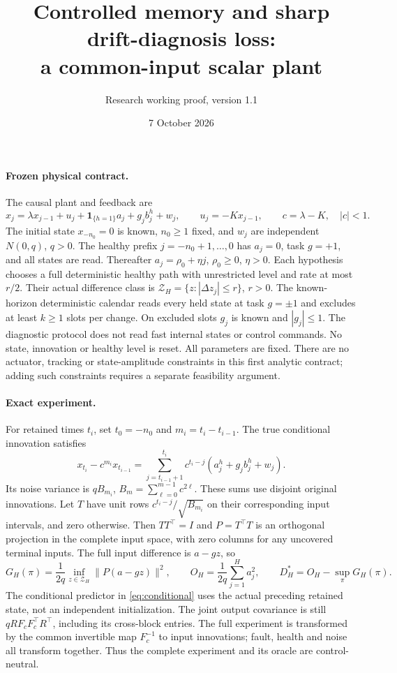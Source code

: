 \documentclass[11pt]{article}
\title{Controlled memory and sharp drift-diagnosis loss:\\a common-input scalar plant}
\author{Research working proof, version 1.1}
\date{7 October 2026}
\begin{document}
\maketitle
\paragraph{Frozen physical contract.}
The causal plant and feedback are
\[
x_j=\lambda x_{j-1}+u_j+\mathbf1_{\{h=1\}}a_j+g_jb_j^h+w_j,\qquad
u_j=-Kx_{j-1},\qquad c=\lambda-K,\quad |c|<1.
\]
The initial state $x_{-n_0}=0$ is known, $n_0\ge1$ fixed, and
$w_j$ are independent $N(0,q)$, $q>0$. The healthy prefix
$j=-n_0+1,\ldots,0$ has $a_j=0$, task $g=+1$, and all states are read.
Thereafter $a_j=\rho_0+\eta j$, $\rho_0\ge0$, $\eta>0$.
Each hypothesis chooses a full deterministic healthy path with unrestricted
level and rate at most $r/2$. Their actual difference class is
$\mathcal Z_H=\{z:|\Delta z_j|\le r\}$, $r>0$.
The known-horizon deterministic calendar reads every held state at task
$g=\pm1$ and excludes at least $k\ge1$ slots per change.
On excluded slots $g_j$ is known and $|g_j|\le1$.
The diagnostic protocol does not read fast internal states or control
commands. No state, innovation or healthy level is reset.
All parameters are fixed. There are no actuator, tracking or state-amplitude
constraints in this first analytic contract; adding such constraints requires
a separate feasibility argument.

\paragraph{Exact experiment.}
For retained times $t_i$, set $t_0=-n_0$ and $m_i=t_i-t_{i-1}$.
The true conditional innovation satisfies
\begin{equation}\label{eq:conditional}
x_{t_i}-c^{m_i}x_{t_{i-1}}
=\sum_{j=t_{i-1}+1}^{t_i}c^{t_i-j}(a_j^h+g_jb_j^h+w_j).
\end{equation}
Its noise variance is $qB_{m_i}$,
$B_m=\sum_{\ell=0}^{m-1}c^{2\ell}$.
These sums use disjoint original innovations. Let $T$ have unit rows
$c^{t_i-j}/\sqrt{B_{m_i}}$ on their corresponding input intervals,
and zero otherwise. Then $TT^\top=I$ and $P=T^\top T$ is an orthogonal
projection in the complete input space, with zero columns for any uncovered
terminal inputs. The full input difference is $a-gz$, so
\[
G_H(\pi)=\frac1{2q}\inf_{z\in\mathcal Z_H}\|P(a-gz)\|^2,\qquad
O_H=\frac1{2q}\sum_{j=1}^H a_j^2,\qquad D_H^*=O_H-\sup_\pi G_H(\pi).
\]
The conditional predictor in \eqref{eq:conditional} uses the actual preceding
retained state, not an independent initialization. The joint output
covariance is still $qRF_cF_c^\top R^\top$, including its cross-block entries.
The full experiment is transformed by the common invertible map $F_c^{-1}$
to input innovations; fault, health and noise all transform together.
Thus the complete experiment and its oracle are control-neutral.
\end{document}
